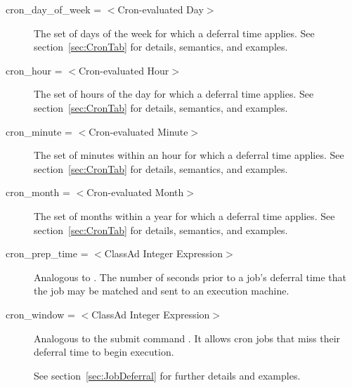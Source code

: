 \begin{description}
\label{condor-submit-cron-day-of-week}
\item[cron\_day\_of\_week = $<$Cron-evaluated Day$>$]
The set of days of the week for which a deferral time applies.
See section~\ref{sec:CronTab} for details, semantics, and examples.

\label{condor-submit-cron-hour}
\item[cron\_hour = $<$Cron-evaluated Hour$>$]
The set of hours of the day for which a deferral time applies.
See section~\ref{sec:CronTab} for details, semantics, and examples.

\label{condor-submit-cron-minute}
\item[cron\_minute = $<$Cron-evaluated Minute$>$]
The set of minutes within an hour for which a deferral time applies.
See section~\ref{sec:CronTab} for details, semantics, and examples.

\label{condor-submit-cron-month}
\item[cron\_month = $<$Cron-evaluated Month$>$]
The set of months within a year for which a deferral time applies.
See section~\ref{sec:CronTab} for details, semantics, and examples.

\label{condor-submit-cron-prep-time}
\item[cron\_prep\_time = $<$ClassAd Integer Expression$>$]
Analogous to .
The number of seconds prior to a job's deferral time that
the job may be matched and sent to an execution machine.


\label{condor-submit-cron-window}
\item[cron\_window = $<$ClassAd Integer Expression$>$]
Analogous to the submit command .
It allows cron jobs that
miss their deferral time to begin execution.

See section~\ref{sec:JobDeferral} for further details and examples.



\end{description}

